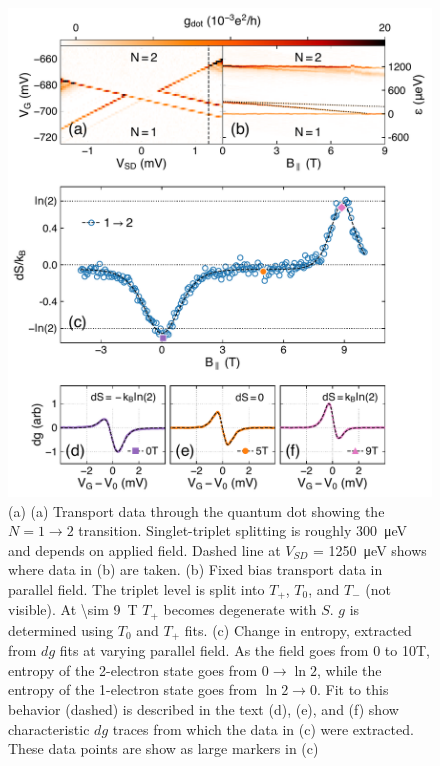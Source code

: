 \documentclass[preprint,showpacs,preprintnumbers,amsmath,amssymb,pra,aps,superscriptaddress]{revtex4-1}
\begin{document}
\begin{figure}
        \includegraphics[width=1.0\columnwidth]{../figures/figure_4.pdf}
        \caption{\label{fig:fig4}(a) (a) Transport data through the quantum dot showing the $N=1 \rightarrow 2$ transition. Singlet-triplet splitting is roughly \SI{300}{\micro\electronvolt} and depends on applied field. Dashed line at $V_{SD}$ = \SI{1250}{\micro\electronvolt} shows where data in (b) are taken. (b) Fixed bias transport data in parallel field. The triplet level is split into $T_+$, $T_0$, and $T_{-}$ (not visible). At \SI[input-protect-tokens]{\sim 9}{\tesla} $T_+$ becomes degenerate with $S$. $g$ is determined using $T_0$ and $T_+$ fits. (c) Change in entropy, extracted from $dg$ fits at varying parallel field. As the field goes from 0 to 10T, entropy of the 2-electron state goes from $0  \rightarrow \ln{2}$, while the entropy of the 1-electron state goes from $\ln{2} \rightarrow 0$. Fit to this behavior (dashed) is described in the text (d), (e), and (f) show characteristic $dg$ traces from which the data in (c) were extracted. These data points are show as large markers in (c)}
\end{figure}
\end{document}
